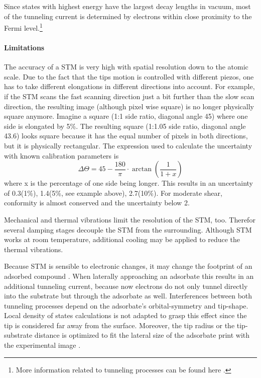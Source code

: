Since states with highest energy have the largest decay lengths in vacuum, most of the tunneling current is determined by electrons within close proximity to the Fermi level.\footnote{More information related to tunneling processes can be found here \cite{bonnell_scanning_1993}.}

\paragraph{Limitations}The accuracy of a STM is very high with spatial resolution down to the atomic scale. Due to the fact that the tips motion is controlled with different piezos, one has to take different elongations in different directions into account. For example, if the STM scans the fast scanning direction just a bit further than the slow scan direction, the resulting image (although pixel wise square) is no longer physically square anymore. Imagine a square (1:1 side ratio, diagonal angle 45\textdegree) where one side is elongated by 5\%. The resulting square (1:1.05 side ratio, diagonal angle 43.6\textdegree) looks square because it has the equal number of pixels in both directions, but it is physically rectangular. The expression used to calculate the uncertainty with known calibration parameters is
$$\Delta \Theta = 45 - \frac{180}{\pi}\cdot\arctan(\frac{1}{1+x})$$ where x is the percentage of one side being longer. This results in an uncertainty of 0.3\textdegree(1\%), 1.4\textdegree(5\%, see example above), 2.7\textdegree(10\%). For moderate shear, conformity is almost conserved and the uncertainty below 2\textdegree.

Mechanical and thermal vibrations limit the resolution of the STM, too. Therefor several damping stages decouple the STM from the surrounding. Although STM works at room temperature, additional cooling may be applied to reduce the thermal vibrations.

Because STM is sensible to electronic changes, it may change the footprint of an adsorbed compound \cite{sautet_interpretation_1992}. When laterally approaching an adsorbate this results in an additional tunneling current, because now electrons do not only tunnel directly into the substrate but through the adsorbate as well. Interferences between both tunneling processes depend on the adsorbate's orbital-symmetry and tip-shape. Local density of states calculations \cite{tersoff_theory_1985, lang_theory_1986, eigler_imaging_1991} is not adapted to grasp this effect since the tip is considered far away from the surface. Moreover, the tip radius or the tip-substrate distance is optimized to fit the lateral size of the adsorbate print with the experimental image \cite{tersoff_theory_1985, eigler_imaging_1991}.